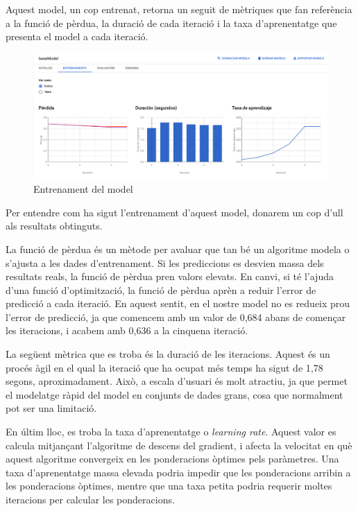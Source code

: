 \documentclass[11pt,longbibliography]{article}
\theoremstyle{definition}
\theoremstyle{remark}
\begin{document}
Aquest model, un cop entrenat, retorna un seguit de mètriques que fan referència a la funció de pèrdua, la duració de cada iteració i la taxa d'aprenentatge que presenta el model a cada iteració.


\begin{figure}[H]
\begin{center}
\includegraphics[width=12.5cm]{log1}
\end{center}
\caption{Entrenament del model}
\label{fig:log1}
\end{figure}


Per entendre com ha sigut l'entrenament d'aquest model, donarem un cop d'ull als resultats obtinguts.



La funció de pèrdua és un mètode per avaluar que tan bé un algoritme modela o s'ajusta a les dades d'entrenament. Si les prediccions es desvien massa dels resultats reals, la funció de pèrdua pren valors elevats. En canvi, si té l'ajuda d'una funció d'optimització, la funció de pèrdua aprèn a reduir l'error de predicció a cada iteració. En aquest sentit, en el nostre model no es redueix prou l'error de predicció, ja que comencem amb un valor de 0,684 abans de començar les iteracions, i acabem amb 0,636 a la cinquena iteració.



La següent mètrica que es troba és la duració de les iteracions. Aquest és un procés àgil en el qual la iteració que ha ocupat més temps ha sigut de 1,78 segons, aproximadament. Això, a escala d'usuari és molt atractiu, ja que permet el modelatge ràpid del model en conjunts de dades grans, cosa que normalment pot ser una limitació.



En últim lloc, es troba la taxa d'aprenentatge o \emph{learning rate}. Aquest valor es calcula mitjançant l'algoritme de descens del gradient, i afecta la velocitat en què aquest algoritme convergeix en les ponderacions òptimes pels paràmetres. Una taxa d'aprenentatge massa elevada podria impedir que les ponderacions arribin a les ponderacions òptimes, mentre que una taxa petita podria requerir moltes iteracions per calcular les ponderacions.
\end{document}
